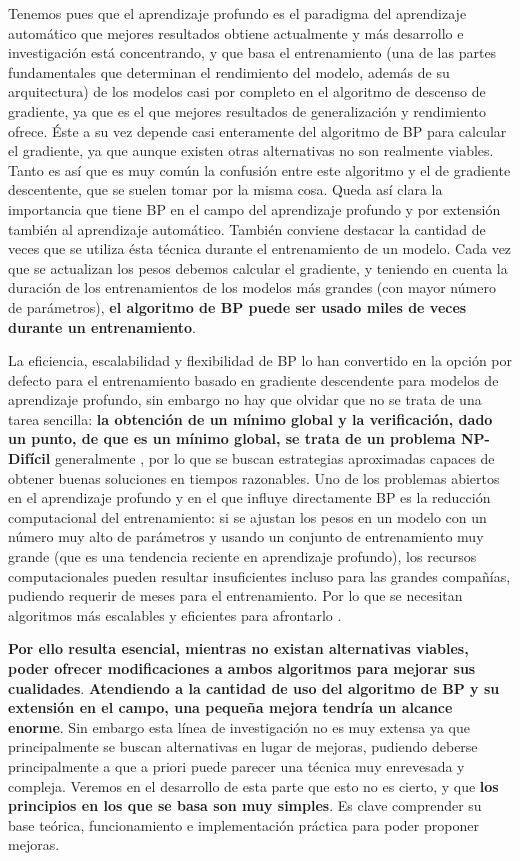 Tenemos pues que el aprendizaje profundo es el paradigma del aprendizaje automático que mejores resultados obtiene actualmente y más desarrollo e investigación está concentrando, y que basa el entrenamiento (una de las partes fundamentales que determinan el rendimiento del modelo, además de su arquitectura) de los modelos casi por completo en el algoritmo de descenso de gradiente, ya que es el que mejores resultados de generalización y rendimiento ofrece. Éste a su vez depende casi enteramente del algoritmo de BP para calcular el gradiente, ya que aunque existen otras alternativas no son realmente viables. Tanto es así que es muy común la confusión entre este algoritmo y el de gradiente descentente, que se suelen tomar por la misma cosa. Queda así clara la importancia que tiene BP en el campo del aprendizaje profundo y por extensión también al aprendizaje automático. También conviene destacar la cantidad de veces que se utiliza ésta técnica durante el entrenamiento de un modelo. Cada vez que se actualizan los pesos debemos calcular el gradiente, y teniendo en cuenta la duración de los entrenamientos de los modelos más grandes (con mayor número de parámetros), \textbf{el algoritmo de BP puede ser usado miles de veces durante un entrenamiento}.

La eficiencia, escalabilidad y flexibilidad de BP lo han convertido en la opción por defecto para el entrenamiento basado en gradiente descendente para modelos de aprendizaje profundo, sin embargo no hay que olvidar que no se trata de una tarea sencilla: \textbf{la obtención de un mínimo global y la verificación, dado un punto, de que es un mínimo global, se trata de un problema NP-Difícil} generalmente \cite{NPHardProblem}, por lo que se buscan estrategias aproximadas capaces de obtener buenas soluciones en tiempos razonables. Uno de los problemas abiertos en el aprendizaje profundo y en el que influye directamente BP es la reducción computacional del entrenamiento: si se ajustan los pesos en un modelo con un número muy alto de parámetros y usando un conjunto de entrenamiento muy grande (que es una tendencia reciente en aprendizaje profundo), los recursos computacionales pueden resultar insuficientes incluso para las grandes compañías, pudiendo requerir de meses para el  entrenamiento. Por lo que se necesitan algoritmos más escalables y eficientes para afrontarlo \cite{Problem3_accel}.

\textbf{Por ello resulta esencial, mientras no existan alternativas viables, poder ofrecer modificaciones a ambos algoritmos para mejorar sus cualidades}.\textbf{ Atendiendo a la cantidad de uso del algoritmo de BP y su extensión en el campo, una pequeña mejora tendría un alcance enorme}. Sin embargo esta línea de investigación no es muy extensa ya que principalmente se buscan alternativas en lugar de mejoras, pudiendo deberse principalmente a que a priori puede parecer una técnica muy enrevesada y compleja. Veremos en el desarrollo de esta parte que esto no es cierto, y que \textbf{los principios en los que se basa son muy simples}. Es clave comprender su base teórica, funcionamiento e implementación práctica para poder proponer mejoras. 

